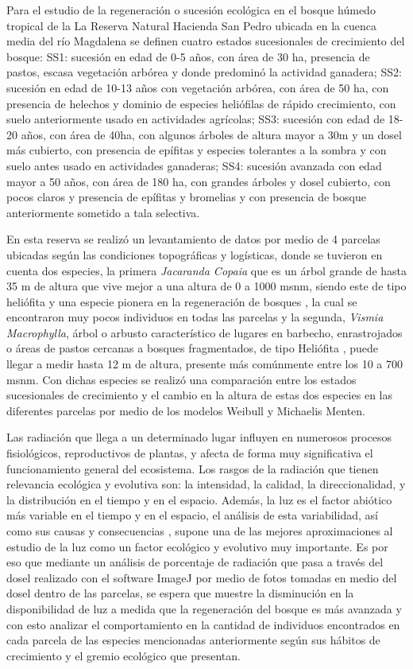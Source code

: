 \documentclass[letterpaper,9pt,twocolumn,twoside,]{pinp}
\begin{document}
Para el estudio de la regeneración o sucesión ecológica en el bosque
húmedo tropical de la La Reserva Natural Hacienda San Pedro ubicada en
la cuenca media del río Magdalena se definen cuatro estados sucesionales
de crecimiento del bosque: SS1: sucesión en edad de 0-5 años, con área
de 30 ha, presencia de pastos, escasa vegetación arbórea y donde
predominó la actividad ganadera; SS2: sucesión en edad de 10-13 años con
vegetación arbórea, con área de 50 ha, con presencia de helechos y
dominio de especies heliófilas de rápido crecimiento, con suelo
anteriormente usado en actividades agrícolas; SS3: sucesión con edad de
18-20 años, con área de 40ha, con algunos árboles de altura mayor a 30m
y un dosel más cubierto, con presencia de epífitas y especies tolerantes
a la sombra y con suelo antes usado en actividades ganaderas; SS4:
sucesión avanzada con edad mayor a 50 años, con área de 180 ha, con
grandes árboles y dosel cubierto, con pocos claros y presencia de
epífitas y bromelias y con presencia de bosque anteriormente sometido a
tala selectiva.

En esta reserva se realizó un levantamiento de datos por medio de 4
parcelas ubicadas según las condiciones topográficas y logísticas, donde
se tuvieron en cuenta dos especies, la primera \emph{Jacaranda Copaia}
que es un árbol grande de hasta 35 m de altura que vive mejor a una
altura de 0 a 1000 msnm, siendo este de tipo heliófita y una especie
pionera en la regeneración de bosques \citep{tapia}, la cual se
encontraron muy pocos individuos en todas las parcelas y la segunda,
\emph{Vismia Macrophylla}, árbol o arbusto característico de lugares en
barbecho, enrastrojados o áreas de pastos cercanas a bosques
fragmentados, de tipo Heliófita \citep{leza}, puede llegar a medir hasta
12 m de altura, presente más comúnmente entre los 10 a 700
msnm\citep{vismia}. Con dichas especies se realizó una comparación entre
los estados sucesionales de crecimiento y el cambio en la altura de
estas dos especies en las diferentes parcelas por medio de los modelos
Weibull y Michaelis Menten.

Las radiación que llega a un determinado lugar influyen en numerosos
procesos fisiológicos, reproductivos de plantas, y afecta de forma muy
significativa el funcionamiento general del ecosistema. Los rasgos de la
radiación que tienen relevancia ecológica y evolutiva son: la
intensidad, la calidad, la direccionalidad, y la distribución en el
tiempo y en el espacio. Además, la luz es el factor abiótico más
variable en el tiempo y en el espacio, el análisis de esta variabilidad,
así como sus causas y consecuencias , supone una de las mejores
aproximaciones al estudio de la luz como un factor ecológico y evolutivo
muy importante. \citep{vallares} Es por eso que mediante un análisis de
porcentaje de radiación que pasa a través del dosel realizado con el
software ImageJ por medio de fotos tomadas en medio del dosel dentro de
las parcelas, se espera que muestre la disminución en la disponibilidad
de luz a medida que la regeneración del bosque es más avanzada y con
esto analizar el comportamiento en la cantidad de individuos encontrados
en cada parcela de las especies mencionadas anteriormente según sus
hábitos de crecimiento y el gremio ecológico que presentan.
\end{document}
